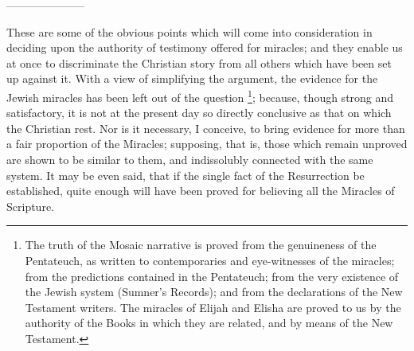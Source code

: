 ———————

These are some of the obvious points which will
come into consideration in deciding upon the authority of testimony
offered for miracles; and they enable us at once to discriminate the
Christian story from all others which have been set up against it.
With a view of simplifying the argument, the evidence for the Jewish
miracles has been left out of the question \footnote{The truth of the Mosaic narrative is proved from the genuineness of
the Pentateuch, as written to contemporaries and eye-witnesses of the
miracles; from the predictions contained in the Pentateuch; from the
very existence of the Jewish system (Sumner's Records); and from the
declarations of the New Testament writers. The miracles of Elijah and
Elisha are proved to us by the authority of the Books in which they
are related, and by means of the New Testament.}; because, though strong and satisfactory, it is not at the
present day so directly conclusive as that on which the Christian
rest. Nor is it necessary, I conceive, to bring evidence for more than
a fair proportion of the Miracles; supposing, that is, those which
remain unproved are shown to be similar to them, and indissolubly
connected with the same system. It may be even said, that if the
single fact of the Resurrection be established, quite enough will have
been proved for believing all the Miracles of Scripture.

